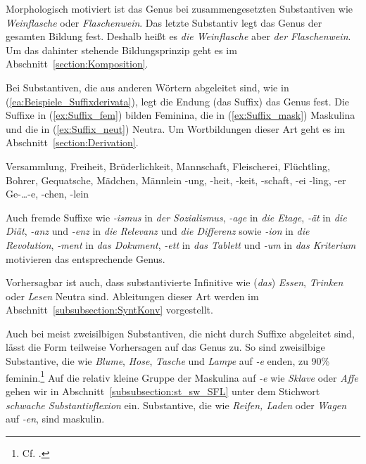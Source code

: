 Morphologisch motiviert ist das Genus bei zusammengesetzten Substantiven wie \textit{Weinflasche} oder \textit{Flaschenwein}. Das letzte Substantiv legt das Genus der gesamten Bildung fest. Deshalb heißt es \textit{die Weinflasche} aber \textit{der Flaschenwein}. Um das dahinter stehende Bildungsprinzip geht es im Abschnitt~\ref{section:Komposition}.

Bei Substantiven, die aus anderen Wörtern abgeleitet sind, wie in (\ref{ea:Beispiele_Suffixderivata}), legt die Endung (das Suffix) das Genus fest. Die Suffixe in (\ref{ex:Suffix_fem}) bilden Feminina, die in (\ref{ex:Suffix_mask}) Maskulina und die in (\ref{ex:Suffix_neut}) Neutra. Um Wortbildungen dieser Art geht es im Abschnitt~\ref{section:Derivation}.

\ea \label{ea_Suffixe_Genus}
\ea \label{ea:Beispiele_Suffixderivata} Versammlung, Freiheit, Brüderlichkeit, Mannschaft, Fleischerei, Flüchtling, Bohrer, Gequatsche, Mädchen, Männlein
\ex \label{ex:Suffix_fem} -ung, -heit, -keit, -schaft, -ei
\ex \label{ex:Suffix_mask} -ling, -er 
\ex \label{ex:Suffix_neut} Ge-\dots-e, -chen, -lein
\z 
\z 

Auch fremde Suffixe wie \textit{-ismus} in \textit{der Sozialismus}, \textit{-age} in \textit{die Etage}, \textit{-ät} in \textit{die Diät}, \textit{-anz} und \textit{-enz} in \textit{die Relevanz} und \textit{die Differenz} sowie \textit{-ion} in \textit{die Revolution}, \textit{-ment} in \textit{das Dokument}, \textit{-ett} in \textit{das Tablett} und \textit{-um} in \textit{das Kriterium} motivieren das entsprechende Genus. 

Vorhersagbar ist auch, dass substantivierte Infinitive wie (\textit{das}) \textit{Essen}, \textit{Trinken} oder \textit{Lesen} Neutra sind. Ableitungen dieser Art werden im Abschnitt~\ref{subsubsection:SyntKonv} vorgestellt. 

Auch bei meist zweisilbigen Substantiven, die nicht durch Suffixe abgeleitet sind, lässt die Form teilweise Vorhersagen auf das Genus zu. So sind zweisilbige Substantive, die wie \textit{Blume}, \textit{Hose}, \textit{Tasche} und \textit{Lampe} auf \textit{-e} enden, zu 90\% feminin.\footnote{Cf. \citet[93]{Wegener1995}.} Auf die relativ kleine Gruppe der Maskulina auf \textit{-e} wie \textit{Sklave} oder \textit{Affe} gehen wir in Abschnitt~\ref{subsubsection:st_sw_SFL} unter dem Stichwort \textit{schwache Substantivflexion} ein. Substantive, die wie \textit{Reifen, Laden} oder \textit{Wagen} auf \textit{-en}, sind maskulin.

